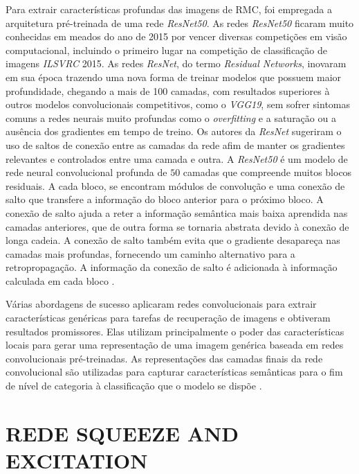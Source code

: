 Para extrair características profundas das imagens de \gls{RMC}, foi empregada a arquitetura pré-treinada de uma rede \textit{ResNet50}. As redes \textit{ResNet50} ficaram muito conhecidas em meados do ano de 2015 por vencer diversas competições em visão computacional, incluindo o primeiro lugar na competição de classificação de imagens \textit{ILSVRC} 2015. As redes \textit{ResNet}, do termo \textit{Residual Networks}, inovaram em sua época trazendo uma nova forma de treinar modelos que possuem maior profundidade, chegando a mais de 100 camadas, com resultados superiores à outros modelos convolucionais competitivos, como o \textit{VGG19}, sem sofrer sintomas comuns a redes neurais muito profundas como o \textit{overfitting} e a saturação ou a ausência dos gradientes em tempo de treino. Os autores da \textit{ResNet} sugeriram o uso de saltos de conexão entre as camadas da rede afim de manter os gradientes relevantes e controlados entre uma camada e outra.  A \textit{ResNet50} é um modelo de rede neural convolucional profunda de $50$ camadas que compreende muitos blocos residuais. A cada bloco, se encontram módulos de convolução e uma conexão de salto que transfere a informação do bloco anterior para o próximo bloco. A conexão de salto ajuda a reter a informação semântica mais baixa aprendida nas camadas anteriores, que de outra forma se tornaria abstrata devido à conexão de longa cadeia. A conexão de salto também evita que o gradiente desapareça nas camadas mais profundas, fornecendo um caminho alternativo para a retropropagação. A informação da conexão de salto é adicionada à informação calculada em cada bloco \cite{heDeepResidualLearning2015}.

Várias abordagens de sucesso aplicaram redes convolucionais para extrair características genéricas para tarefas de recuperação de imagens e obtiveram resultados promissores. Elas utilizam principalmente o poder das características locais para gerar uma representação de uma imagem genérica baseada em redes convolucionais pré-treinadas. As representações das camadas finais da rede convolucional são utilizadas para capturar características semânticas para o fim de nível de categoria à classificação que o modelo se dispõe \cite{alzubiContentbasedImageRetrieval2017b}.

\section{REDE SQUEEZE AND EXCITATION}
\label{sec:se_net}


